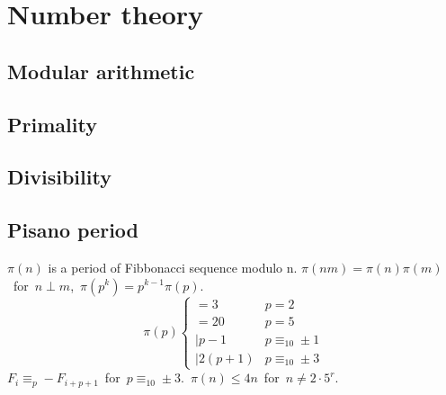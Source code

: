 \chapter{Number theory}

\section{Modular arithmetic}

\section{Primality}

\section{Divisibility}



\section{Pisano period}
	$\pi(n)$ is a period of Fibbonacci sequence modulo n.
	\mbox{$\pi(nm)=\pi(n)\pi(m)$ for $n \perp m$, $\pi(p^k)=p^{k-1}\pi(p)$.}
	\[\pi(p) \left\{
	\begin{array}{ll}
		=3 & p=2\\
		=20 & p=5\\
		\mid p-1 & p\equiv_{10} \pm 1 \\
		\mid 2(p+1) & p\equiv_{10} \pm 3
	\end{array}\right.\]
	\mbox{$F_i \equiv_p -F_{i+p+1}$ for $p\equiv_{10} \pm 3$. $\pi(n) \le 4n$ for $n\neq 2\cdot 5^r$.}
